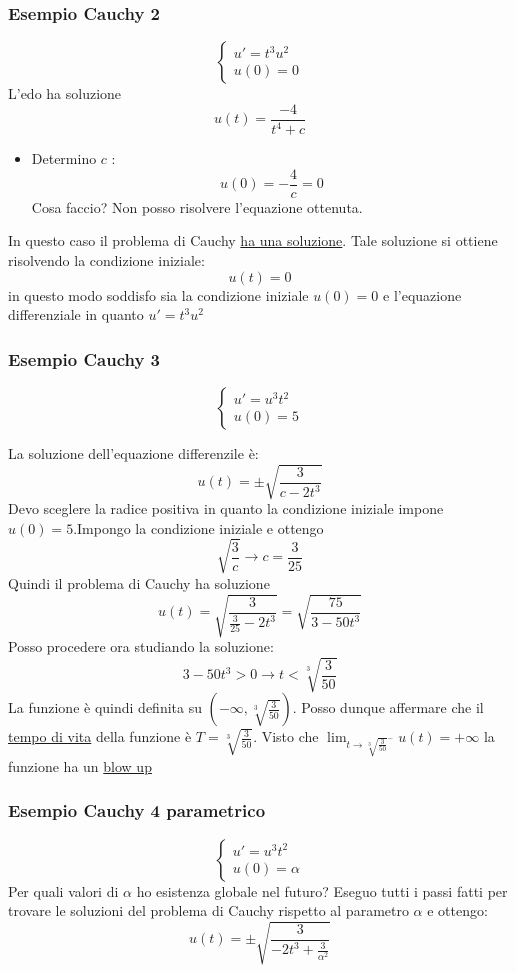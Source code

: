 \subsubsection*{Esempio Cauchy 2}
\[
	\begin{cases}
		u' = t^3 u^2 \\
		u\left( 0 \right) = 0
	\end{cases}
\]
L'edo ha soluzione
\[
	u\left( t \right) = \frac{-4}{t ^{4}+ c}
\]
\begin{itemize}
	\item Determino $ c $ :
	      \[
		      u\left( 0 \right) = -\frac{4}{c} =0
	      \]
	      Cosa faccio? Non posso risolvere l'equazione ottenuta.
\end{itemize}
In questo caso il problema di Cauchy \underline{ha una soluzione}. Tale soluzione si ottiene risolvendo la condizione iniziale:
\[
	u\left( t \right) =0
\]
in questo modo soddisfo sia la condizione iniziale $ u\left( 0 \right) =0 $ e l'equazione differenziale in quanto $ u' = t^3 u^2 $
\subsubsection*{Esempio Cauchy 3}
\[
	\begin{cases}
		u' = u^3 t^2 \\
		u\left( 0 \right) =5
	\end{cases}
\]

La soluzione dell'equazione differenzile è:
\[
	u\left( t \right) = \pm \sqrt{\frac{3}{c-2t^3}}
\]
Devo sceglere la radice positiva in quanto la condizione iniziale impone $ u\left( 0 \right) =5 $.Impongo la condizione iniziale e ottengo
\[
	\sqrt{\frac{3}{c}} \rightarrow c = \frac{3}{25}
\]
Quindi il problema di Cauchy ha soluzione
\[
	u\left( t \right) = \sqrt{\frac{3}{\frac{3}{25} - 2 t ^3}} = \sqrt{ \frac{75}{3 - 50 t^3}}
\]
Posso procedere ora studiando la soluzione:
\[
	3 - 50 t^3 > 0 \rightarrow t < \sqrt[3]{\frac{3}{50}}
\]
La funzione è quindi definita su $ \left( - \infty, \sqrt[3]{\frac{3}{50}}  \right)  $. Posso dunque affermare che il \underline{tempo di vita} della funzione è $ T= \sqrt[3]{\frac{3}{50}} $. Visto che $ \lim_{t \to \sqrt[3]{\frac{3}{50}}^{-}} u\left( t \right)   = + \infty $ la funzione ha un \underline{blow up}
\subsubsection*{Esempio Cauchy 4 parametrico}
\[
	\begin{cases}
		u' = u^3 t^2 \\
		u\left( 0 \right) = \alpha
	\end{cases}
\]
Per quali valori di $ \alpha  $ ho esistenza globale nel futuro?
\vskip3mm
Eseguo tutti i passi fatti per trovare le soluzioni del problema di Cauchy rispetto al parametro $ \alpha  $ e ottengo:
\[
	u\left( t \right) = \pm \sqrt{\frac{3}{-2t^3 + \frac{3}{\alpha ^2}}}
\]
